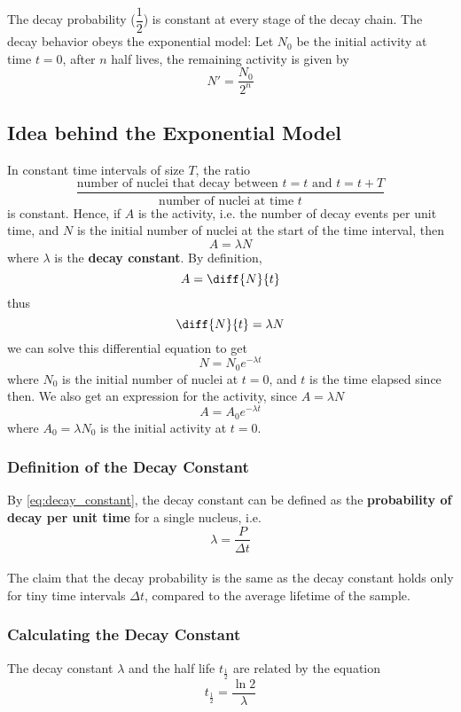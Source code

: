 \documentclass[a4paper,12pt]{article}
\newcommand{\lb}{\\[8pt]}
\begin{document}
The decay probability ($\dfrac{1}{2}$) is constant at every stage of the decay chain. The decay behavior obeys the exponential model: Let $N_0$ be the initial activity at time $t = 0$, after $n$ half lives, the remaining activity is given by
$$N' = \frac{N_0}{2^n}$$

\subsection{Idea behind the Exponential Model}

In constant time intervals of size $T$, the ratio $$\frac{\text{number of nuclei that decay between $t = t$ and $t = t + T$}}{\text{number of nuclei at time $t$}}$$
is constant.
Hence, if $A$ is the activity, i.e. the number of decay events per unit time, and $N$ is the initial number of nuclei at the start of the time interval, then \begin{equation}\label{eq:decay_constant}
  A = \lambda N
\end{equation}where $\lambda$ is the \textbf{decay constant}.
By definition, $$A = \diff{N}{t}$$
thus $$\diff{N}{t} = \lambda N$$
we can solve this differential equation to get \begin{equation}\label{eq:NN_0}
  N = N_0 e^{-\lambda t}
\end{equation}
where $N_0$ is the initial number of nuclei at $t = 0$, and $t$ is the time elapsed since then.
We also get an expression for the activity, since $A = \lambda N$
$$A = A_0 e^{-\lambda t}$$
where $A_0 = \lambda N_0$ is the initial activity at $t = 0$.

\subsubsection{Definition of the Decay Constant}

By \cref{eq:decay_constant}, the decay constant can be defined as the \textbf{probability of decay per unit time} for a single nucleus, i.e. $$\lambda = \frac{P}{\Delta t}$$\lb
The claim that the decay probability is the same as the decay constant holds only for tiny time intervals $\Delta t$, compared to the average lifetime of the sample.

\subsubsection{Calculating the Decay Constant}

The decay constant $\lambda$ and the half life $t_{\frac{1}{2}}$ are related by the equation \begin{equation}\label{eq:decay_constant_half_life}
  t_{\frac{1}{2}} = \frac{\ln 2}{\lambda}
\end{equation}
\end{document}
